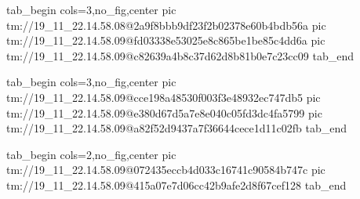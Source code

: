  
 
 
 
 

\qqSecCmtScr


\ifcmt
  tab_begin cols=3,no_fig,center
    pic tm://19_11_22.14.58.08@2a9f8bbb9df23f2b02378e60b4bdb56a
    pic tm://19_11_22.14.58.09@fd03338e53025e8c865be1be85c4dd6a
    pic tm://19_11_22.14.58.09@c82639a4b8c37d62d8b81b0e7c23cc09
  tab_end
\fi


\ifcmt
  tab_begin cols=3,no_fig,center
    pic tm://19_11_22.14.58.09@cce198a48530f003f3e48932ec747db5
    pic tm://19_11_22.14.58.09@e380d67d5a7e8e040c05fd3dc4fa5799
    pic tm://19_11_22.14.58.09@a82f52d9437a7f36644cece1d11c02fb
  tab_end
\fi


\ifcmt
  tab_begin cols=2,no_fig,center
    pic tm://19_11_22.14.58.09@072435eccb4d033c16741c90584b747c
    pic tm://19_11_22.14.58.09@415a07e7d06cc42b9afe2d8f67cef128
  tab_end
\fi

